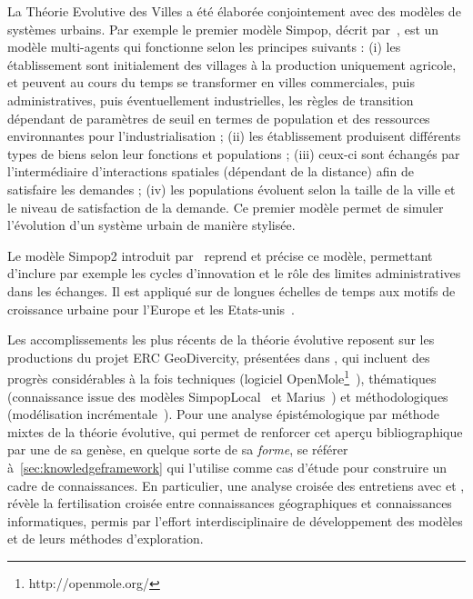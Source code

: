 La Théorie Evolutive des Villes a été élaborée conjointement avec des modèles de systèmes urbains. Par exemple le premier modèle Simpop, décrit par~\cite{sanders1997simpop}, est un modèle multi-agents qui fonctionne selon les principes suivants : (i) les établissement sont initialement des villages à la production uniquement agricole, et peuvent au cours du temps se transformer en villes commerciales, puis administratives, puis éventuellement industrielles, les règles de transition dépendant de paramètres de seuil en termes de population et des ressources environnantes pour l'industrialisation ; (ii) les établissement produisent différents types de biens selon leur fonctions et populations ; (iii) ceux-ci sont échangés par l'intermédiaire d'interactions spatiales (dépendant de la distance) afin de satisfaire les demandes ; (iv) les populations évoluent selon la taille de la ville et le niveau de satisfaction de la demande. Ce premier modèle permet de simuler l'évolution d'un système urbain de manière stylisée.

Le modèle Simpop2 introduit par~\cite{bretagnolle2006theory} reprend et précise ce modèle, permettant d'inclure par exemple les cycles d'innovation et le rôle des limites administratives dans les échanges. Il est appliqué sur de longues échelles de temps aux motifs de croissance urbaine pour l'Europe et les Etats-unis~\cite{doi:10.1177/0042098010377366}.


Les accomplissements les plus récents de la théorie évolutive reposent sur les productions du projet ERC GeoDivercity, présentées dans \cite{pumain2017urban}, qui incluent des progrès considérables à la fois techniques (logiciel OpenMole\footnote{http://openmole.org/}~\cite{reuillon2013openmole}), thématiques (connaissance issue des modèles SimpopLocal~\cite{schmitt2014modelisation} et Marius~\cite{cottineau2014evolution}) et méthodologiques (modélisation incrémentale~\cite{cottineau2015incremental}). Pour une analyse épistémologique par méthode mixtes de la théorie évolutive, qui permet de renforcer cet aperçu bibliographique par une de sa genèse, en quelque sorte de sa \emph{forme}, se référer à~\ref{sec:knowledgeframework} qui l'utilise comme cas d'étude pour construire un cadre de connaissances. En particulier, une analyse croisée des entretiens avec  et , révèle la fertilisation croisée entre connaissances géographiques et connaissances informatiques, permis par l'effort interdisciplinaire de développement des modèles et de leurs méthodes d'exploration.



